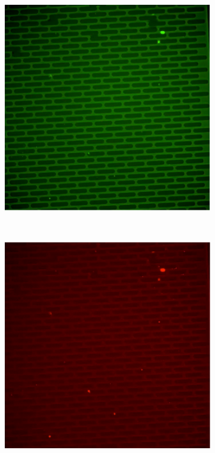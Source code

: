 \documentclass[pdftex,12pt,a4paper]{report}
\begin{document}
\begin{figure}[H]

\centering

\begin{subfigure}{0.3\textwidth}
  \centering
  \includegraphics[width=\textwidth]{images/caspase_onset_sample}
  \caption{}
  \label{fig:caspase_onset_sample}
\end{subfigure}%
~
\begin{subfigure}{0.3\textwidth}
  \centering
  \includegraphics[width=\textwidth]{images/pi_onset_sample}
  \caption{}
  \label{fig:pi_onset_sample}
\end{subfigure}%


\end{figure}
\end{document}
